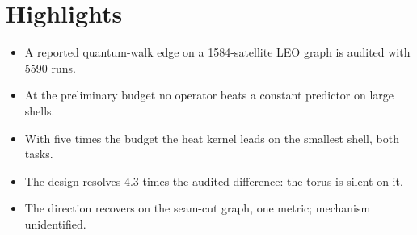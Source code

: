 \documentclass[11pt]{article}
\begin{document}
\section*{Highlights}
\begin{itemize}
\item A reported quantum-walk edge on a 1584-satellite LEO graph is audited with 5590 runs.
\item At the preliminary budget no operator beats a constant predictor on large shells.
\item With five times the budget the heat kernel leads on the smallest shell, both tasks.
\item The design resolves 4.3 times the audited difference: the torus is silent on it.
\item The direction recovers on the seam-cut graph, one metric; mechanism unidentified.
\end{itemize}
\end{document}
